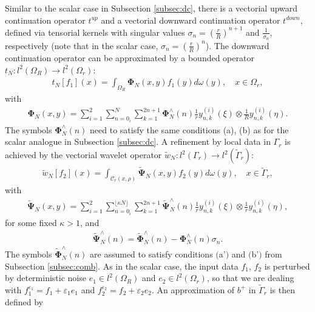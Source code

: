 \documentclass[a4paper, 10pt]{article}
\numberwithin{equation}{section}
\theoremstyle{definition}
\newcommand{\eps}{\ensuremath{\varepsilon}}
\begin{document}
Similar to the scalar case in Subsection \ref{subsec:dc}, there is a vectorial upward continuation operator $t^{up}$ and a vectorial downward continuation operator $t^{down}$, defined via tensorial kernels with singular values $\sigma_n=\left(\frac{r}{R}\right)^{n+1}$ and $\frac{1}{\sigma_n}$, respectively (note that in the scalar case, $\sigma_n=\left(\frac{r}{R}\right)^{n}$). The downward continuation operator can be approximated by a bounded operator $t_N:l^2(\Omega_R)\to l^2(\Omega_r)$:
\begin{align}
{t_N[f_1](x)=\int_{\Omega_R}\mathbf{\Phi}_N(x,y) f_1(y)d\omega(y),\quad x\in\Omega_r,}
\end{align}
with
\begin{align}
{\mathbf{\Phi}_N(x,y)=\sum_{i=1}^2\sum_{n=0_i}^{N}\sum_{k=1}^{2n+1}\mathbf{\Phi}_{N}^\wedge(n)\frac{1}{r}{y}^{(i)}_{n,k}\left(\xi\right)\otimes \frac{1}{R}{y}^{(i)}_{n,k}\left(\eta\right).}\label{eqn:scalkernel2}
\end{align}
The symbols $\mathbf{\Phi}_{N}^\wedge(n)$ need to satisfy the same conditions (a), (b) as for the scalar analogue in Subsection \ref{subsec:dc}. A refinement by local data in $\Gamma_r$ is achieved by the vectorial wavelet operator $\tilde{{w}}_N:l^2({\Gamma}_r)\to l^2(\tilde{\Gamma}_r)$:
\begin{align}\label{eqn:wjdef}
{\tilde{{w}}_N[f_2](x)=\int_{\mathcal{C}_r(x,\rho)}\tilde{\mathbf{\Psi}}_N(x,y) f_2(y)d\omega(y),\quad x\in\tilde{\Gamma}_r,}
\end{align}
with
\begin{align}
{\tilde{\mathbf{\Psi}}_N(x,y)=\sum_{i=1}^2\sum_{n=0_i}^{\lfloor\kappa N\rfloor}\sum_{k=1}^{2n+1}\tilde{ \mathbf{\Psi}}_{N}^\wedge(n)\frac{1}{r}{y}^{(i)}_{n,k}\left(\xi\right)\otimes \frac{1}{r}{y}^{(i)}_{n,k}\left(\eta\right)},\label{eqn:wavkernel2}
\end{align}
for some fixed $\kappa>1$, and 
\begin{align}
{\tilde{ \mathbf{\Psi}}_{N}^\wedge(n)=\tilde{ \mathbf{\Phi}}_{N}^\wedge(n)-\mathbf{\Phi}_{N}^\wedge(n)\sigma_n.}
\end{align}
The symbols $\tilde{ \mathbf{\Phi}}_{N}^\wedge(n)$ are assumed to satisfy conditions $($a'$)$ and $($b'$)$ from Subsection \ref{subsec:comb}. As in the scalar case, the input data $f_1$, $f_2$ is perturbed by deterministic noise $e_1\in l^2(\Omega_R)$ and $e_2\in l^2(\Omega_r)$, so that we are dealing with $f_1^{\eps_1}=f_1+\eps_1 e_1$ and $f_2^{\eps_2}=f_2+\eps_2 e_2$. An approximation of $b^+$ in $\tilde{\Gamma}_r$ is then defined by
\end{document}
